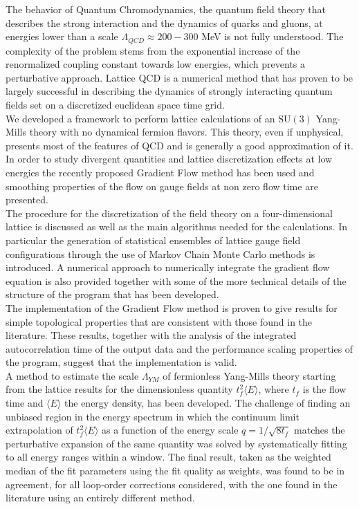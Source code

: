 The behavior of Quantum Chromodynamics, the quantum field theory that describes the strong interaction and the dynamics of quarks and gluons, at energies lower than a scale $\Lambda_{QCD} \approx 200-300$ MeV is not fully understood. The complexity of the problem stems from the exponential increase of the renormalized coupling constant towards low energies, which prevents a perturbative approach. Lattice QCD is a numerical method that has proven to be largely successful in describing the dynamics of strongly interacting quantum fields set on a discretized euclidean space time grid.\\

We developed a framework to perform lattice calculations of an $\mathrm{SU}(3)$ Yang-Mills theory with no dynamical fermion flavors. This theory, even if unphysical, presents most of the features of QCD and is generally a good approximation of it. In order to study divergent quantities and lattice discretization effects at low energies the recently proposed Gradient Flow method \cite{luscher_properties_2010} has been used and smoothing properties of the flow on gauge fields at non zero flow time are presented. \\
The procedure for the discretization of the field theory on a four-dimensional lattice is discussed as well as the main algorithms needed for the calculations. In particular the generation of statistical ensembles of lattice gauge field configurations through the use of Markov Chain Monte Carlo methods is introduced. A numerical approach to numerically integrate the gradient flow equation is also provided together with 
some of the more technical details of the structure of the program that has been developed.\\

The implementation of the Gradient Flow method is proven to give results for simple topological properties that are consistent with those found in the literature. These results, together with the analysis of the integrated autocorrelation time of the output data and the performance scaling properties of the program, suggest that the implementation is valid.\\
A method to estimate the scale $\Lambda_{YM}$ of fermionless Yang-Mills theory starting from the lattice results for the dimensionless quantity $t_f^2\langle E \rangle$, where $t_f$ is the flow time and $\langle E \rangle$ the energy density, has been developed. The challenge of finding an unbiased region in the energy spectrum in which the continuum limit extrapolation of $t_f^2\langle E \rangle$ as a function of the energy scale $q=1/\sqrt{8t_f}$ matches the perturbative expansion of the same quantity was solved by systematically fitting to all energy ranges within a window. The final result, taken as the weighted median of the fit parameters using the fit quality as weights, was found to be in agreement, for all loop-order corrections considered, with the one found in the literature \cite{capitani_non-perturbative_1999} using an entirely different method.
